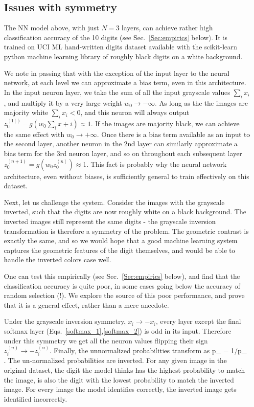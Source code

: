 \documentclass[twocolumn, prl, nofootinbib]{revtex4-1}
\begin{document}
\subsection{Issues with symmetry}

The NN model above, with just $N=3$ layers, can achieve rather high classification accuracy of the 10 digits (see Sec.~\ref{Sec:empirics} below).
It is trained on UCI ML hand-written digits dataset available with the scikit-learn python machine learning library\cite{scikit-learn} of roughly black digits on a white background.

We note in passing that with the exception of the input layer to the neural network, at each level we can approximate a bias term, even in this architecture. In the input neuron layer, we take the sum of all the input grayscale values $\sum_i x_i$, and multiply it by a very large weight $w_0 \rightarrow -\infty$. As long as the the images are majority white $\sum_i x_i < 0$, and this neuron will always output $z_0^{(1))} = g\left( w_0 \sum_i x+i \right)\approx 1$. If the images are majority black, we can achieve the same effect with $w_0 \rightarrow +\infty$. Once there is a bias term available as an input to the second layer, another neuron in the 2nd layer can similarly approximate a bias term for the 3rd neuron layer, and so on throughout each subsequent layer $z_0^{(n+1)} = g\left( w_0 z_0^{(n)} \right)\approx 1$. This fact is probably why the neural network architecture, even without biases, is sufficiently general to train effectively on this dataset.

Next, let us challenge the system. Consider the images with the grayscale inverted, such that the digits are now roughly white on 
a black background. The inverted images still represent the same digits - the grayscale inversion transformation is therefore a symmetry of the problem. The geometric contrast is exactly the same, and so we would hope that a good machine learning system captures the geometric features of the digit themselves, and would be able to handle the inverted colors case well.

One can test this empirically (see Sec.~\ref{Sec:empirics} below), and find that the classification accuracy is quite poor, in some cases going below the accuracy of random selection (!). We explore the source of this poor performance, and prove that it is a general effect, rather than a mere anecdote.

Under the grayscale inversion symmetry, $x_i \rightarrow - x_i$, every layer except the final softmax layer (Eqs.~\eqref{softmax_1},\eqref{softmax_2}) is odd in its 
input. Therefore under this symmetry we get all the neuron values flipping their sign $z^{(n)}_i \rightarrow - z^{(n)}_i$. Finally, the unnormalized probabilities transform as
\be
{\tilde p}_{\alpha} \rightarrow \exp{} = 1/{\tilde p}_{\alpha}
\; .
\ee
The un-normalized probabilities are inverted. For any given image in the original dataset, the digit the model thinks has the highest probability to match the image, is also the digit with the lowest probability to match the inverted image. For every image the model identifies correctly, the inverted image gets identified incorrectly.
\end{document}
